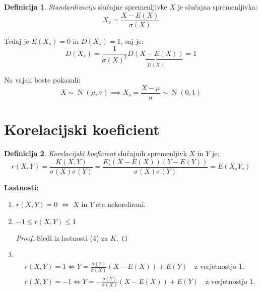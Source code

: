 \documentclass[12pt]{book}
\def\n{\noindent}
\theoremstyle{definition}
\newtheorem{definicija}{Definicija}
\theoremstyle{plain}
\theoremstyle{plain}
\theoremstyle{plain}
\theoremstyle{remark}
\begin{document}
\begin{definicija}
    \emph{Standardizacija} slučajne spremenljivke $X$ je slučajna spremenljivka: 
    $$
    X_s=\frac{X-E(X)}{\sigma(X)}
    $$
\end{definicija}

\n Tedaj je $E\left(X_s\right)=0$ in $D\left(X_s\right)=1$, saj je: 
$$
D\left(X_s\right)=\frac{1}{\sigma(X)^2} \underbrace{D(X-E(X))}_{D(X)}=1
$$

\begin{zgled}
    Na vajah boste pokazali: 
    $$
    X \sim \operatorname{N}(\mu, \sigma) \implies X_s = \frac{X - \mu}{\sigma} \sim \operatorname{N}(0,1)
    $$  
\end{zgled}

\section{Korelacijski koeficient}

\begin{definicija}
    \emph{Korelacijski koeficient} slučajnih spremenljivk $X$ in $Y$ je: 
    $$
    r(X, Y)=\frac{K(X, Y)}{\sigma(X) \sigma(Y)}=\frac{E((X-E(X)) (Y-E(Y))}{\sigma(X) \sigma(Y)} = E(X_s Y_s)
    $$
\end{definicija}

\n \textbf{Lastnosti:}

\begin{enumerate}
    \item $r(X, Y)=0$ $\iff$ $X$ in $Y$ sta nekorelirani.
    \item $-1 \leq r(X, Y) \leq 1$
    \begin{proof}
        Sledi iz lastnosti (4) za $K$.  
    \end{proof}
    \item ~ \vspace{-32pt}
    $$
    \begin{aligned}
        &r(X, Y)=1 \iff Y=\frac{\sigma(Y)}{\sigma(X)} (X-E(X))+E(Y) \quad \text{z verjetnostjo $1$.} \\
        &r(X, Y)=-1 \iff Y=-\frac{\sigma(Y)}{\sigma(X)} (X-E(X))+E(Y) \quad \text{z verjetnostjo $1$.}
    \end{aligned}
    $$
\end{enumerate}
\end{document}
